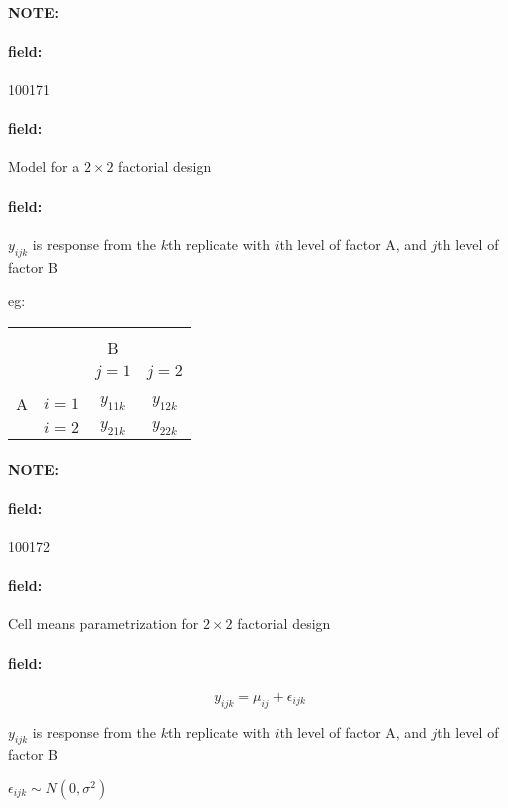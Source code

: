 \documentclass[12pt]{article}
\newenvironment{note}{\paragraph{NOTE:}}{}
\newenvironment{field}{\paragraph{field:}}{}
\begin{document}
\begin{note}
    \begin{field}
        \tiny 100171
    \end{field}
    \begin{field}
        Model for a $2\times 2$ factorial design
    \end{field}
    \begin{field}
        $y_{ijk}$ is response from the $k$th replicate with $i$th level of factor A, and $j$th level of factor B


        eg:

        \begin{center}
          \begin{tabular}{|c|c|c|c|}
          \hline \\
          & & B &\\
          & & $j=1$ & $j = 2$\\
          \hline \\
          A & $i = 1$ & $y_{11k}$ & $y_{12k}$\\
          & $i=2$ & $y_{21k}$ & $y_{22k}$\\
          \hline
          \end{tabular}
        \end{center}
    \end{field}
\end{note}


\begin{note}
    \begin{field}
        \tiny 100172
    \end{field}
    \begin{field}
        Cell means parametrization for $2 \times 2$ factorial design
    \end{field}
    \begin{field}
        $$y_{ijk} = \mu_{ij} + \epsilon_{ijk}$$



        $y_{ijk}$ is response from the $k$th replicate with $i$th level of factor A, and $j$th level of factor B

        $\epsilon_{ijk} \sim N(0,\sigma^2)$
    \end{field}
\end{note}
\end{document}
